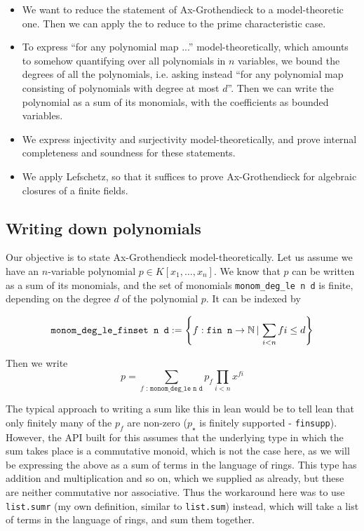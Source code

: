 \begin{itemize}
  \item We want to reduce the statement of Ax-Grothendieck to a model-theoretic one.
        Then we can apply the  to
        reduce to the prime characteristic case.
  \item To express ``for any polynomial map ...'' model-theoretically,
        which amounts to somehow quantifying over all polynomials
        in $n$ variables,
        we bound the degrees of all the polynomials,
        i.e. asking instead ``for any polynomial map consisting of
        polynomials with degree at most $d$''.
        Then we can write the polynomial as a sum of its monomials,
        with the coefficients as bounded variables.
  \item We express injectivity and surjectivity model-theoretically,
        and prove internal completeness and soundness for these statements.
  \item We apply Lefschetz, so that it suffices to prove Ax-Grothendieck for
        algebraic closures of a finite fields.
\end{itemize}

\subsection{Writing down polynomials}

Our objective is to state Ax-Grothendieck model-theoretically.
Let us assume we have an $n$-variable polynomial $p \in K[x_{1},\dots,x_{n}]$.
We know that $p$ can be written as a sum of its monomials,
and the set of monomials \texttt{monom\_deg\_le n d} is finite,
depending on the degree $d$ of the polynomial $p$.
It can be indexed by

\[ \texttt{monom\_deg\_le\_finset n d} := \left\{ f : \texttt{fin n} \to \mathbb{N} \,|\, \sum_{i < n} f i \le d \right\}\]

Then we write
\[ p = \sum_{f\texttt{ : monom\_deg\_le n d}} p_{f}\prod_{i < n} x^{f i}\]

The typical approach to writing a sum like this in lean would be
to tell lean that only finitely many of the $p_{f}$ are non-zero
($p_{\star}$ is finitely supported - \texttt{finsupp}).
However, the API built for this assumes that the underlying
type in which the sum takes place is a commutative monoid,
which is not the case here,
as we will be expressing the above as a sum of terms
in the language of rings.
This type has addition and multiplication and so on,
which we supplied as  already,
but these are neither commutative nor associative.
Thus the workaround here was to use \texttt{list.sumr}
(my own definition, similar to \texttt{list.sum}) instead,
which will take a list of terms in the language of rings, and sum them together.

